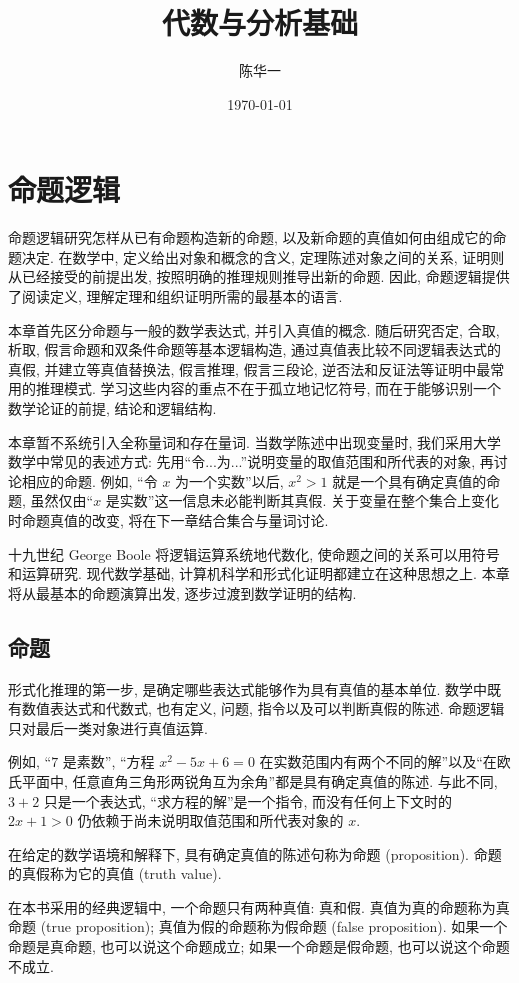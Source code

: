 \documentclass[usesamecnt, thmcnt=section, lang=cn, newtx, 10pt, scheme=chinese]{elegantbook}
\title{代数与分析基础}
\author{陈华一}
\institute{西湖大学理论科学研究院}
\date{\today}
\begin{document}
\maketitle
\frontmatter
\tableofcontents
\mainmatter

\chapter{命题逻辑}

命题逻辑研究怎样从已有命题构造新的命题, 以及新命题的真值如何由组成它的命题决定. 在数学中, 定义给出对象和概念的含义, 定理陈述对象之间的关系, 证明则从已经接受的前提出发, 按照明确的推理规则推导出新的命题. 因此, 命题逻辑提供了阅读定义, 理解定理和组织证明所需的最基本的语言.

本章首先区分命题与一般的数学表达式, 并引入真值的概念. 随后研究否定, 合取, 析取, 假言命题和双条件命题等基本逻辑构造, 通过真值表比较不同逻辑表达式的真假, 并建立等真值替换法, 假言推理, 假言三段论, 逆否法和反证法等证明中最常用的推理模式. 学习这些内容的重点不在于孤立地记忆符号, 而在于能够识别一个数学论证的前提, 结论和逻辑结构.

本章暂不系统引入全称量词和存在量词. 当数学陈述中出现变量时, 我们采用大学数学中常见的表述方式: 先用``令...为...''说明变量的取值范围和所代表的对象, 再讨论相应的命题. 例如, ``令 $x$ 为一个实数''以后, $x^2>1$ 就是一个具有确定真值的命题, 虽然仅由``$x$ 是实数''这一信息未必能判断其真假. 关于变量在整个集合上变化时命题真值的改变, 将在下一章结合集合与量词讨论.

十九世纪 George Boole 将逻辑运算系统地代数化, 使命题之间的关系可以用符号和运算研究. 现代数学基础, 计算机科学和形式化证明都建立在这种思想之上. 本章将从最基本的命题演算出发, 逐步过渡到数学证明的结构.

\section{命题}

形式化推理的第一步, 是确定哪些表达式能够作为具有真值的基本单位. 数学中既有数值表达式和代数式, 也有定义, 问题, 指令以及可以判断真假的陈述. 命题逻辑只对最后一类对象进行真值运算.

例如, ``$7$ 是素数'', ``方程 $x^2-5x+6=0$ 在实数范围内有两个不同的解''以及``在欧氏平面中, 任意直角三角形两锐角互为余角''都是具有确定真值的陈述. 与此不同, $3+2$ 只是一个表达式, ``求方程的解''是一个指令, 而没有任何上下文时的 $2x+1>0$ 仍依赖于尚未说明取值范围和所代表对象的 $x$.

\begin{definition}\label{def:statement}
在给定的数学语境和解释下, 具有确定真值的陈述句称为{\color{blue}命题 (proposition)}. 命题的真假称为它的{\color{blue}真值 (truth value)}.

在本书采用的经典逻辑中, 一个命题只有两种真值: 真和假. 真值为真的命题称为{\color{blue}真命题 (true proposition)}; 真值为假的命题称为{\color{blue}假命题 (false proposition)}. 如果一个命题是真命题, 也可以说这个命题{\color{blue}成立}; 如果一个命题是假命题, 也可以说这个命题{\color{blue}不成立}.
\end{definition}
\end{document}
